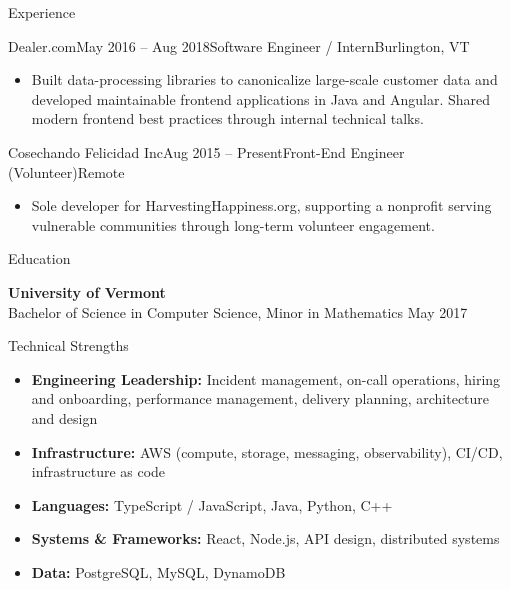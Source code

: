 \documentclass{resume} %
\begin{document}
\begin{rSection}{Experience}
\begin{rSubsection}{Dealer.com}{May 2016 -- Aug 2018}{Software Engineer / Intern}{Burlington, VT}
\begin{itemize}
  \item Built data-processing libraries to canonicalize large-scale customer data and developed maintainable frontend applications in Java and Angular. Shared modern frontend best practices through internal technical talks.
\end{itemize}

\end{rSubsection}


\begin{rSubsection}{Cosechando Felicidad Inc}{Aug 2015 -- Present}{Front-End Engineer (Volunteer)}{Remote}

\begin{itemize}
  \item Sole developer for HarvestingHappiness.org, supporting a nonprofit serving vulnerable communities through long-term volunteer engagement.
\end{itemize}

\end{rSubsection}

\end{rSection}


\begin{rSection}{Education}

{\bf University of Vermont} \\
Bachelor of Science in Computer Science, 
Minor in Mathematics \hfill {May 2017}

\end{rSection}


\begin{rSection}{Technical Strengths}

\begin{itemize}
  \item \textbf{Engineering Leadership:} Incident management, on-call operations, hiring and onboarding, performance management, delivery planning, architecture and design
  \item \textbf{Infrastructure:} AWS (compute, storage, messaging, observability), CI/CD, infrastructure as code
  \item \textbf{Languages:} TypeScript / JavaScript, Java, Python, C++
  \item \textbf{Systems \& Frameworks:} React, Node.js, API design, distributed systems
  \item \textbf{Data:} PostgreSQL, MySQL, DynamoDB
\end{itemize}

\end{rSection}
\end{document}
